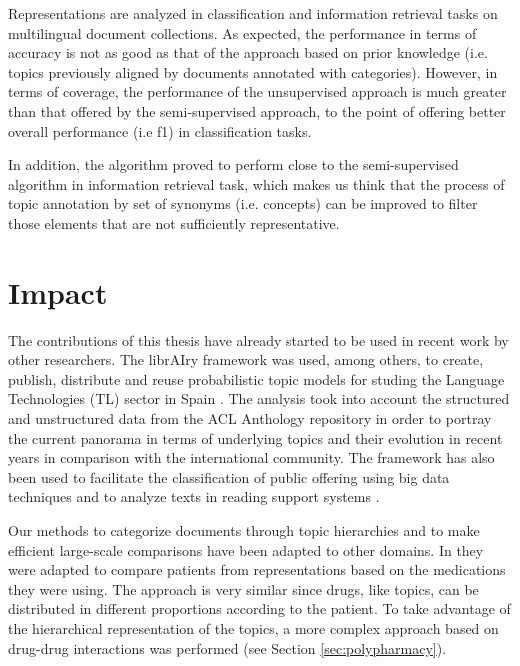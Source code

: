 Representations are analyzed in classification and information retrieval tasks on multilingual document collections. As expected, the performance in terms of accuracy is not as good as that of the approach based on prior knowledge (i.e. topics previously aligned by documents annotated with categories). However, in terms of coverage, the performance of the unsupervised approach is much greater than that offered by the semi-supervised approach, to the point of offering better overall performance (i.e f1) in classification tasks. 

In addition, the algorithm proved to perform close to the semi-supervised algorithm in information retrieval task, which makes us think that the process of topic annotation by set of synonyms (i.e. concepts) can be improved to filter those elements that are not sufficiently representative.


\section{Impact}

The contributions of this thesis have already started to be used in recent work by other researchers. The librAIry framework was used, among others, to create, publish, distribute and reuse probabilistic topic models for studing the Language Technologies (TL) sector in Spain \citep{Samy2019}. The analysis took into account  the structured and unstructured data from the ACL Anthology repository in order to portray the current panorama in terms of underlying topics and their evolution in recent years in comparison with the international community. The framework has also been used to facilitate the classification of public offering using big data techniques \citep{Olga2019} and to analyze texts in reading support systems \citep{Teresa2020}.

Our methods to categorize documents through topic hierarchies and to make efficient large-scale comparisons  have been adapted to other domains. In \citep{Badenes-Olmedo2019c} they were adapted to compare patients from representations based on the medications they were using. The approach is very similar since drugs, like topics, can be distributed in different proportions according to the patient. To take advantage of the hierarchical representation of the topics, a more complex approach based on drug-drug interactions was performed (see Section \ref{sec:polypharmacy}).

